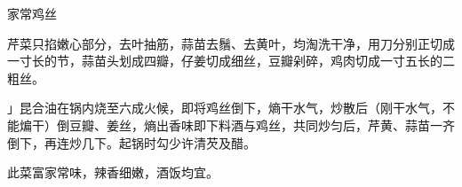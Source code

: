 \begin{recipe}{家常鸡丝}

\ingredients



\cooking

\step 芹菜只掐嫩心部分，去叶抽筋，蒜苗去鬚、去黄叶，均淘洗干净，用刀分别正切成一寸长的节，蒜苗头划成四瓣，仔姜切成细丝，豆瓣剁碎，鸡肉切成一寸五长的二粗丝。

\step 」昆合油在锅内烧至六成火候，即将鸡丝倒下，熵干水气，炒散后（刚干水气，不能煸干）倒豆瓣、姜丝，熵出香味即下料酒与鸡丝，共同炒匀后，芹黄、蒜苗一齐倒下，再连炒几下。起锅时勾少许清芡及醋。

\notes

此菜富家常味，辣香细嫩，酒饭均宜。

\end{recipe}

